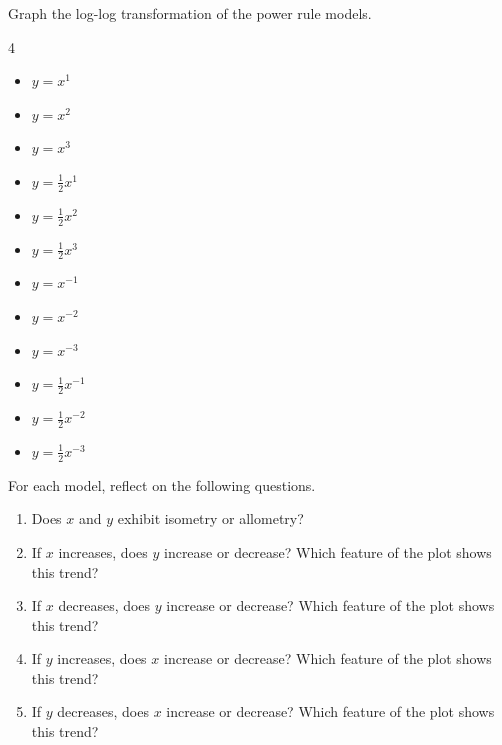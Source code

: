 \documentclass[../main.tex]{subfiles}
\begin{document}
\begin{exercise}
  Graph the log-log transformation of the power rule models. 
  \begin{multicols}{4}
    \begin{itemize}
      \item \(y = x^{1}\)
      \item \(y = x^{2}\)
      \item \(y = x^{3}\)
      \item \(y = \frac{1}{2}x^{1}\)
      \item \(y = \frac{1}{2}x^{2}\)
      \item \(y = \frac{1}{2}x^{3}\)
      \item \(y = x^{-1}\)
      \item \(y = x^{-2}\)
      \item \(y = x^{-3}\)
      \item \(y = \frac{1}{2}x^{-1}\)
      \item \(y = \frac{1}{2}x^{-2}\)
      \item \(y = \frac{1}{2}x^{-3}\)
    \end{itemize}
  \end{multicols}

  For each model, reflect on the following questions.
  \begin{enumerate}
    \item Does \(x\) and \(y\) exhibit isometry or allometry?
    \item If \(x\) increases, does \(y\) increase or decrease? Which feature of the plot shows this trend?
    \item If \(x\) decreases, does \(y\) increase or decrease? Which feature of the plot shows this trend?
    \item If \(y\) increases, does \(x\) increase or decrease? Which feature of the plot shows this trend?
    \item If \(y\) decreases, does \(x\) increase or decrease? Which feature of the plot shows this trend?
  \end{enumerate}

  \begin{solution}
    \phantom{top}




\end{solution}
\end{exercise}
\end{document}
